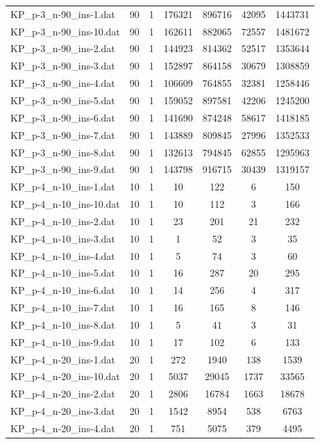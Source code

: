 \begin{table}[!ht]
\begin{tabular}{lcccccc}
KP\_p-3\_n-90\_ins-1.dat & 90 & 1 & 176321 & 896716 & 42095 & 1443731 \\
KP\_p-3\_n-90\_ins-10.dat & 90 & 1 & 162611 & 882065 & 72557 & 1481672 \\
KP\_p-3\_n-90\_ins-2.dat & 90 & 1 & 144923 & 814362 & 52517 & 1353644 \\
KP\_p-3\_n-90\_ins-3.dat & 90 & 1 & 152897 & 864158 & 30679 & 1308859 \\
KP\_p-3\_n-90\_ins-4.dat & 90 & 1 & 106609 & 764855 & 32381 & 1258446 \\
KP\_p-3\_n-90\_ins-5.dat & 90 & 1 & 159052 & 897581 & 42206 & 1245200 \\
KP\_p-3\_n-90\_ins-6.dat & 90 & 1 & 141690 & 874248 & 58617 & 1418185 \\
KP\_p-3\_n-90\_ins-7.dat & 90 & 1 & 143889 & 809845 & 27996 & 1352533 \\
KP\_p-3\_n-90\_ins-8.dat & 90 & 1 & 132613 & 794845 & 62855 & 1295963 \\
KP\_p-3\_n-90\_ins-9.dat & 90 & 1 & 143798 & 916715 & 30439 & 1319157 \\
KP\_p-4\_n-10\_ins-1.dat & 10 & 1 & 10 & 122 & 6 & 150 \\
KP\_p-4\_n-10\_ins-10.dat & 10 & 1 & 10 & 112 & 3 & 166 \\
KP\_p-4\_n-10\_ins-2.dat & 10 & 1 & 23 & 201 & 21 & 232 \\
KP\_p-4\_n-10\_ins-3.dat & 10 & 1 & 1 & 52 & 3 & 35 \\
KP\_p-4\_n-10\_ins-4.dat & 10 & 1 & 5 & 74 & 3 & 60 \\
KP\_p-4\_n-10\_ins-5.dat & 10 & 1 & 16 & 287 & 20 & 295 \\
KP\_p-4\_n-10\_ins-6.dat & 10 & 1 & 14 & 256 & 4 & 317 \\
KP\_p-4\_n-10\_ins-7.dat & 10 & 1 & 16 & 165 & 8 & 146 \\
KP\_p-4\_n-10\_ins-8.dat & 10 & 1 & 5 & 41 & 3 & 31 \\
KP\_p-4\_n-10\_ins-9.dat & 10 & 1 & 17 & 102 & 6 & 133 \\
KP\_p-4\_n-20\_ins-1.dat & 20 & 1 & 272 & 1940 & 138 & 1539 \\
KP\_p-4\_n-20\_ins-10.dat & 20 & 1 & 5037 & 29045 & 1737 & 33565 \\
KP\_p-4\_n-20\_ins-2.dat & 20 & 1 & 2806 & 16784 & 1663 & 18678 \\
KP\_p-4\_n-20\_ins-3.dat & 20 & 1 & 1542 & 8954 & 538 & 6763 \\
KP\_p-4\_n-20\_ins-4.dat & 20 & 1 & 751 & 5075 & 379 & 4495 \\

\end{tabular}
\end{table}

